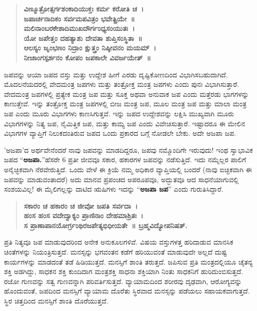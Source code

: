 \begin{verse}
\textbf{ವಿಣ್ಮೂತ್ರೋತ್ಸರ್ಗಶಂಕಾದಿಯುಕ್ತಃ ಕರ್ಮ ಕರೋತಿ ಚ~। \\
ಜಪಾರ್ಚನಾದಿಕಂ ಸರ್ವಮಪವಿತ್ರಂ ಭವೇತ್ಪ್ರಿಯೇ~॥\\
ಮಲಿನಾಂಬರಕೇಶಾದಿಮುಖದೌರ್ಗಂಧ್ಯಸಂಯುತಃ~। \\
ಯೋ ಜಪೇತ್ತಂ ದಹತ್ಯಾಶು ದೇವತಾ ಶುಪ್ತಿಸಂಸ್ಥಿತಾ~॥\\
ಆಲಸ್ಯಂ ಜೃಂಭಣಂ ನಿದ್ರಾಂ ಕ್ಷುತ್ತ್ರಂ ನಿಷ್ಠೀವನಂ ಮಯಮ್~। \\
ನೀಚಾಂಗಸ್ಪರ್ಶನಂ ಕೋಪಂ ಜಪಕಾಲೇ ವಿವರ್ಜಯೇತ್~॥}
\end{verse}
ಜಪವನ್ನು ಆಯಾ ಜಪದ ವಸ್ತು ಮತ್ತು ಉದ್ದೇಶ ಹೀಗೆ ಎರಡು ದೃಷ್ಟಿಕೋಣದಿಂದ ವಿಭಾಗಿಸಬಹುದಾಗಿದೆ. ಮೊದಲನೆಯದರಲ್ಲಿ ವೇದಮಂತ್ರ ಜಪಗಳು ಮತ್ತು ತಂತ್ರೋಕ್ತ ಮಂತ್ರ ಜಪಗಳು ಎಂದು ಪುನಃ ವಿಭಾಗಿಸುತ್ತಾರೆ. ವೇದಮಂತ್ರ ಜಪಗಳಲ್ಲಿ ಪ್ರತ್ಯೇಕ ಮಂತ್ರ ಜಪ ಮತ್ತು ಸೂಕ್ತ ಅಥವಾ ಅನುವಾಕ ಜಪ ಎಂದು ಮತ್ತೆರಡು ಭಾಗಗಳನ್ನು ಕಾಣುತ್ತೇವೆ. ಇನ್ನು ತಂತ್ರೋಕ್ತ ಮಂತ್ರ ಜಪಗಳಲ್ಲಿ ಬೀಜ ಮಂತ್ರ ಜಪ, ಮೂಲ ಮಂತ್ರ ಜಪ ಮತ್ತು ಮಾಲಾ ಮಂತ್ರ ಜಪ ಎಂದು ಮೂರು ವಿಭಾಗಗಳು ಕಾಣಸಿಗುತ್ತವೆ. ಇನ್ನು ಜಪದ ಉದ್ದೇಶವನ್ನು ಲಕ್ಷಿಸಿ ಮುಖ್ಯವಾಗಿ ಮೂರು ವಿಭಾಗಗಳನ್ನು ನಿತ್ಯ ಜಪ, ನೈಮಿತ್ತಿಕ ಜಪ, ಮತ್ತು ಕಾಮ್ಯ ಜಪ ಎಂದು ವಿವೇಚಿಸುತ್ತಾರೆ. ಇಷ್ಟಾದರೂ ಈ ಮೇಲಿನ ವಿಭಾಗಗಳ ವ್ಯಾಪ್ತಿಗೆ ನಿಲುಕದಂತಿರುವ ಜಪದ ಒಂದು ಪ್ರಕಾರದ ಬಗ್ಗೆ ನೋಡಲೇ ಬೇಕು. ಅದೇ ಅಜಪಾ ಜಪ.

’ಅಜಪಾ’ದ ಅರ್ಥವೇನೆಂದರೆ ನಾವು ಜಪವನ್ನು ಮಾಡದಿದ್ದರೂ, ಜಪವು ನಮ್ಮೊಂದಿಗೇ ಇರುವುದು! ಇಂಥ ಸ್ವಾಭಾವಿಕ ಜಪದ “\textbf{ಅಜಪಾ.}”ಹೆಸರೇ 6 ಪ್ರತೀ ಜೀವವೂ ಸಕಾರ, ಹಕಾರಗಳ ಜಪವನ್ನು ನಡೆಸುತ್ತಿದೆ. ಇದು ನಮ್ಮೆಲ್ಲರ ಪಾಲಿಗೆ ಅನೈಚ್ಛಿಕವಾಗಿ ನೆರವೇರುತ್ತಿದೆ. ಒಂದು ವೇಳೆ ಈ ಕ್ರಿಯೆ ನಮ್ಮ ಅಧಿಕಾರ ವ್ಯಾಪ್ತಿಯಲ್ಲಿ ಬಂದರೆ (ನಾವು ಐಚ್ಛಿಕವಾಗಿ ಈ ಜಪವನ್ನು ಮಾಡುವಂತಾದರೆ) ಅದು ಮಾನವ ಪ್ರಪಂಚದ ಅಪರೂಪವೂ, ಅದ್ಭುತವೂ ಆದ ಸಾಧನೆಯಾಗುವಲ್ಲಿ ಸಂಶಯವಿಲ್ಲ! ಈ ಮೈಲಿಗಲ್ಲನ್ನು ದಾಟಿದ ಋಷಿಗಳು ಇದನ್ನು “\textbf{ಅಜಪಾ ಜಪ}” ಎಂದು ಗುರುತಿಸಿದ್ದಾರೆ.
\begin{verse}
\textbf{ಸಕಾರಂ ಚ ಹಕಾರಂ ಚ ಜೀವೋ ಜಪತಿ ಸರ್ವದಾ~।  \\
ಹಂಸ ಹಂಸ ವದೇದ್ವಾಕ್ಯಂ ಪ್ರಾಣಿನಾಂ ದೇಹಮಾಶ್ರಿತಃ~। \\
ಸ ಪ್ರಾಣಾಪಾನಯೋರ್ಗ್ರಂಥಿರಜಪೇತ್ಯಭಿಧೀಯತೇ~॥ ಬ್ರಹ್ಮವಿದ್ಯೋಪನಿಷತ್.}
\end{verse}
ಪ್ರತಿ ನಿತ್ಯವೂ ಜಪ ಮಾಡುವುದರಿಂದ ಅನೇಕ ಅನುಕೂಲಗಳಿವೆ. ವಿಷಯ ವಸ್ತುಗಳತ್ತ ಹರಿದಾಡುವ ಮಾನಸಿಕ ಚಿಂತೆಗಳನ್ನು ನಿಯಂತ್ರಿಸುತ್ತದೆ. ಮನಸ್ಸನ್ನು ಭಗವಂತನ ಕಡೆಗೆ ಹರಿಯುವಂತೆ ಮಾಡುವುದೇ ಅಲ್ಲದೆ ದುಷ್ಟ ಕಾರ್ಯಗಳನ್ನು ಮಾಡದಂತೆ ತಡೆ ಹಿಡಿಯುತ್ತದೆ. ಮನಸ್ಸಿಗೆ ಶಾಂತಿ ತರುತ್ತದೆ. ಜಪಿಸುವ ಪ್ರತಿ ಮಂತ್ರದಲ್ಲಿಯೂ ಚೈತನ್ಯ ಶಕ್ತಿ ಅಡಗಿದ್ದು, ಸಾಧಕನ ಶಕ್ತಿ ಕುಂದಿದಾಗ ಮಂತ್ರಶಕ್ತಿ ಸಾಧನಾ ಶಕ್ತಿಯಾಗಿ ನಿಂತು ಸಾಧಕನಿಗೆ ಹುರಿದುಂಬಿಸುತ್ತದೆ. ರಜೋ ಗುಣವನ್ನು ಸತ್ವ ಗುಣವನ್ನಾಗಿ ಪರಿವರ್ತಿಸುತ್ತದೆ. ವ್ಯಾಯಾಮದಿಂದ ಶರೀರವು ದೃಢವಾಗಿ, ಆರೋಗ್ಯವನ್ನು ಹೊಂದುವಂತೆ, ಜಪದಿಂದ ಮನಸ್ಸಿಗೆ ವ್ಯಾಯಾಮ ದೊರೆತು ಸ್ಥಿರವಾದ ಮನಸ್ಸನ್ನು ಪಡೆಯಲು ಸಹಾಯಕವಾಗುತ್ತದೆ. ಸ್ಥಿರ  ಚಿತ್ತದಿಂದ ಮನಸ್ಸಿಗೆ ಶಾಂತಿ ದೊರೆಯುತ್ತದೆ.


